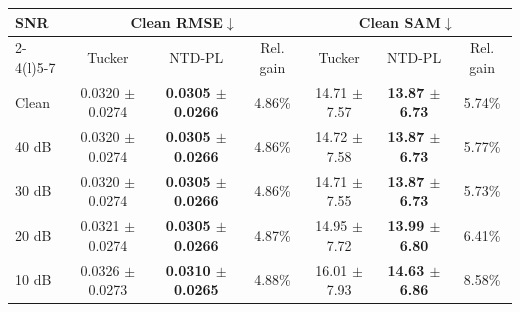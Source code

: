 \begin{tabular}{@{}lcccccc@{}}
\toprule
\multirow{2}{*}{SNR} &
\multicolumn{3}{c}{Clean RMSE$\downarrow$} &
\multicolumn{3}{c}{Clean SAM$\downarrow$} \\
\cmidrule(lr){2-4}\cmidrule(l){5-7}
& Tucker & NTD-PL & Rel. gain &
Tucker & NTD-PL & Rel. gain \\
\midrule
Clean & 0.0320 $\pm$ 0.0274 & \textbf{0.0305 $\pm$ 0.0266} & 4.86\%
& 14.71 $\pm$ 7.57 & \textbf{13.87 $\pm$ 6.73} & 5.74\% \\
40 dB & 0.0320 $\pm$ 0.0274 & \textbf{0.0305 $\pm$ 0.0266} & 4.86\%
& 14.72 $\pm$ 7.58 & \textbf{13.87 $\pm$ 6.73} & 5.77\% \\
30 dB & 0.0320 $\pm$ 0.0274 & \textbf{0.0305 $\pm$ 0.0266} & 4.86\%
& 14.71 $\pm$ 7.55 & \textbf{13.87 $\pm$ 6.73} & 5.73\% \\
20 dB & 0.0321 $\pm$ 0.0274 & \textbf{0.0305 $\pm$ 0.0266} & 4.87\%
& 14.95 $\pm$ 7.72 & \textbf{13.99 $\pm$ 6.80} & 6.41\% \\
10 dB & 0.0326 $\pm$ 0.0273 & \textbf{0.0310 $\pm$ 0.0265} & 4.88\%
& 16.01 $\pm$ 7.93 & \textbf{14.63 $\pm$ 6.86} & 8.58\% \\
\bottomrule
\end{tabular}
